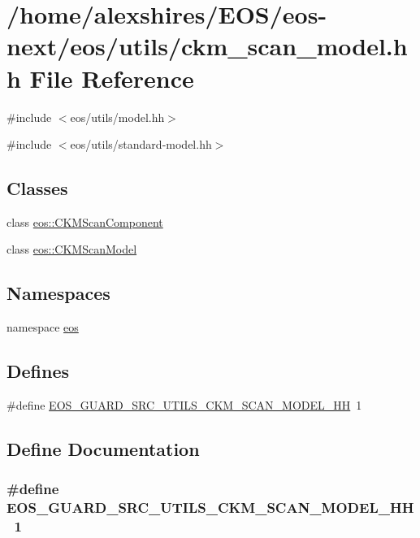 \hypertarget{ckm__scan__model_8hh}{
\section{/home/alexshires/EOS/eos-\/next/eos/utils/ckm\_\-scan\_\-model.hh File Reference}
\label{ckm__scan__model_8hh}
}
{\ttfamily \#include $<$eos/utils/model.hh$>$}\par
{\ttfamily \#include $<$eos/utils/standard-\/model.hh$>$}\par
\subsection*{Classes}
\begin{DoxyCompactItemize}
\item 
class \hyperlink{classeos_1_1CKMScanComponent}{eos::CKMScanComponent}
\item 
class \hyperlink{classeos_1_1CKMScanModel}{eos::CKMScanModel}
\end{DoxyCompactItemize}
\subsection*{Namespaces}
\begin{DoxyCompactItemize}
\item 
namespace \hyperlink{namespaceeos}{eos}
\end{DoxyCompactItemize}
\subsection*{Defines}
\begin{DoxyCompactItemize}
\item 
\#define \hyperlink{ckm__scan__model_8hh_a7a6f2d2b41545d4b1ca5749795e62237}{EOS\_\-GUARD\_\-SRC\_\-UTILS\_\-CKM\_\-SCAN\_\-MODEL\_\-HH}~1
\end{DoxyCompactItemize}


\subsection{Define Documentation}
\hypertarget{ckm__scan__model_8hh_a7a6f2d2b41545d4b1ca5749795e62237}{
\subsubsection[{EOS\_\-GUARD\_\-SRC\_\-UTILS\_\-CKM\_\-SCAN\_\-MODEL\_\-HH}]{\setlength{\rightskip}{0pt plus 5cm}\#define EOS\_\-GUARD\_\-SRC\_\-UTILS\_\-CKM\_\-SCAN\_\-MODEL\_\-HH~1}}
\label{ckm__scan__model_8hh_a7a6f2d2b41545d4b1ca5749795e62237}

